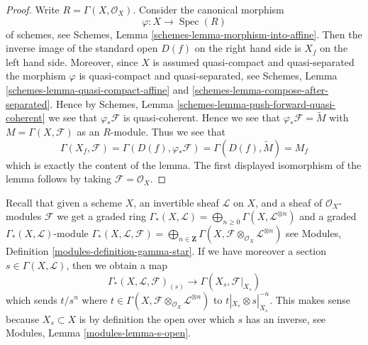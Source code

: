 \documentclass{stacks-project}
\theoremstyle{plain}
\theoremstyle{definition}
\theoremstyle{remark}
\numberwithin{equation}{subsection}
\def\Spec{\mathop{\mathrm{Spec}}}
\begin{document}
\begin{proof}
Write $R = \Gamma(X, \mathcal{O}_X)$. Consider the canonical morphism
$$
\varphi : X \longrightarrow \Spec(R)
$$
of schemes, see
Schemes, Lemma
\ref{schemes-lemma-morphism-into-affine}.
Then the inverse image of the standard open $D(f)$ on the
right hand side is $X_f$ on the left hand side.
Moreover, since $X$ is assumed quasi-compact and quasi-separated
the morphism $\varphi$ is quasi-compact and quasi-separated,
see Schemes, Lemma \ref{schemes-lemma-quasi-compact-affine} and
\ref{schemes-lemma-compose-after-separated}. Hence by
Schemes, Lemma \ref{schemes-lemma-push-forward-quasi-coherent}
we see that $\varphi_*\mathcal{F}$ is quasi-coherent.
Hence we see that $\varphi_*\mathcal{F} = \widetilde M$
with $M = \Gamma(X, \mathcal{F})$ as an $R$-module.
Thus we see that
$$
\Gamma(X_f, \mathcal{F}) =
\Gamma(D(f), \varphi_*\mathcal{F}) =
\Gamma(D(f), \widetilde M) = M_f
$$
which is exactly the content of the lemma. The first displayed isomorphism
of the lemma follows by taking $\mathcal{F} = \mathcal{O}_X$.
\end{proof}

\noindent
Recall that given a scheme $X$, an invertible sheaf $\mathcal{L}$
on $X$, and a sheaf of $\mathcal{O}_X$-modules $\mathcal{F}$
we get a graded ring
$\Gamma_*(X, \mathcal{L}) =
\bigoplus\nolimits_{n \geq 0} \Gamma(X, \mathcal{L}^{\otimes n})$
and a graded $\Gamma_*(X, \mathcal{L})$-module
$\Gamma_*(X, \mathcal{L}, \mathcal{F}) =
\bigoplus\nolimits_{n \in \mathbf{Z}}
\Gamma(X, \mathcal{F} \otimes_{\mathcal{O}_X} \mathcal{L}^{\otimes n})$
see Modules, Definition \ref{modules-definition-gamma-star}.
If we have moreover a section $s \in \Gamma(X, \mathcal{L})$, then
we obtain a map
\begin{equation}
\label{equation-module-invert-s}
\Gamma_*(X, \mathcal{L}, \mathcal{F})_{(s)}
\longrightarrow
\Gamma(X_s, \mathcal{F}|_{X_s})
\end{equation}
which sends $t/s^n$ where
$t \in \Gamma(X, \mathcal{F} \otimes_{\mathcal{O}_X} \mathcal{L}^{\otimes n})$
to $t|_{X_s} \otimes s|_{X_s}^{-n}$. This makes sense
because $X_s \subset X$ is by definition the open over which
$s$ has an inverse, see Modules, Lemma \ref{modules-lemma-s-open}.
\end{document}

